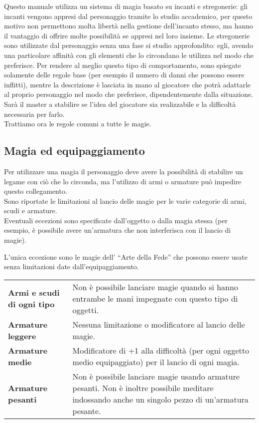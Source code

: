 \documentclass[../manuale_main.tex]{subfiles}
\begin{document}
Questo manuale utilizza un sistema di magia basato su incanti e stregonerie: gli incanti vengono appresi dal personaggio tramite lo studio accademico, per questo motivo non permettono molta libertà nella gestione dell'incanto stesso, ma hanno il vantaggio di offrire molte possibilità se appresi nel loro insieme. 
Le stregonerie sono utilizzate dal personaggio senza una fase si studio approfondito: egli, avendo una particolare affinità con gli elementi che lo circondano le utilizza nel modo che preferisce. Per rendere al meglio questo tipo di comportamento, sono spiegate solamente delle regole base (per esempio il numero di danni che possono essere inflitti), mentre la descrizione è lasciata in mano al giocatore che potrà adattarle al proprio personaggio nel modo che preferisce, dipendentemente dalla situazione. Sarà il master a stabilire se l'idea del giocatore sia realizzabile e la difficoltà necessaria per farlo.\\
Trattiamo ora le regole comuni a tutte le magie.\\


\subsection{Magia ed equipaggiamento}
Per utilizzare una magia il personaggio deve avere la possibilità di stabilire un legame con ciò che lo circonda, ma l'utilizzo di armi o armature può impedire questo collegamento.\\
Sono riportate le limitazioni al lancio delle magie per le varie categorie di armi, scudi e armature.\\
Eventuali eccezioni sono specificate dall'oggetto o dalla magia stessa (per esempio, è possibile avere un'armatura che non interferisca con il lancio di magie).

L'unica eccezione sono le magie dell' ``Arte della Fede'' che possono essere usate senza limitazioni date dall'equipaggiamento.
\renewcommand{\arraystretch}{1.5}
\begin{tabularx}{\linewidth}{l X}
\textbf{Armi e scudi di ogni tipo}&Non è possibile lanciare magie quando si hanno entrambe le mani impegnate con questo tipo di oggetti.\\
\textbf{Armature leggere}&Nessuna limitazione o modificatore al lancio delle magie.\\
\textbf{Armature medie}&Modificatore di +1 alla difficoltà (per ogni oggetto medio equipaggiato) per il lancio di ogni magia.\\
\textbf{Armature pesanti}&Non è possibile lanciare magie usando armature pesanti. Non è inoltre possibile meditare indossando anche un singolo pezzo di un'armatura pesante.\\
\end{tabularx}
\end{document}
